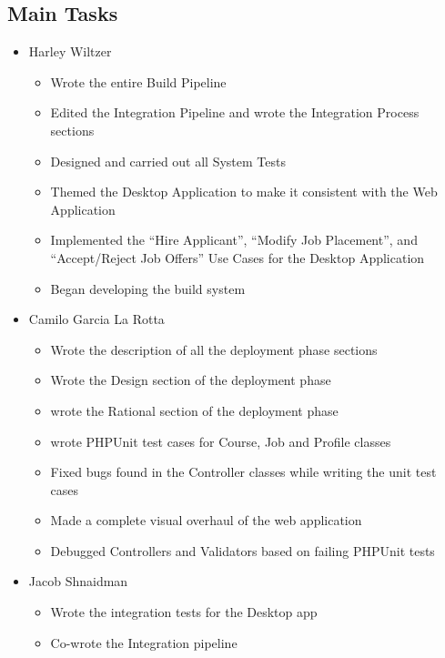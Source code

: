 \documentclass[12pt]{article}
\begin{document}
 \subsection{Main Tasks}


 \begin{itemize}
     \item Harley Wiltzer
    \begin{itemize}
        \item Wrote the entire Build Pipeline
        \item Edited the Integration Pipeline and wrote the Integration Process sections
        \item Designed and carried out all System Tests
        \item Themed the Desktop Application to make it consistent with the Web Application
        \item Implemented the ``Hire Applicant'', ``Modify Job Placement'', and ``Accept/Reject Job
            Offers'' Use Cases for the Desktop Application
        \item Began developing the build system
    \end{itemize}
     \item Camilo Garcia La Rotta
     \begin{itemize}
         \item Wrote the description of all the deployment phase sections
         \item Wrote the Design section of the deployment phase
         \item wrote the Rational section of the deployment phase
         \item wrote PHPUnit test cases for Course, Job and Profile classes
         \item Fixed bugs found in the Controller classes while writing the unit test cases
         \item Made a complete visual overhaul of the web application
         \item Debugged Controllers and Validators based on failing PHPUnit tests
     \end{itemize}
     \item Jacob Shnaidman
        \begin{itemize}
            \item Wrote the integration tests for the Desktop app
            \item Co-wrote the Integration pipeline

\end{itemize}
\end{itemize}
\end{document}
